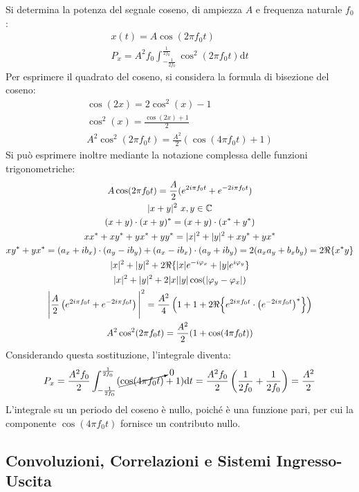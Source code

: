 \documentclass{article}
\newcommand{\df}{\mathrm{d}}
\begin{document}
Si determina la potenza del segnale coseno, di ampiezza $A$ e frequenza naturale $f_0$:
\begin{gather*}
    x(t)=A\cos\left(2\pi f_0t\right)\\
    P_x=\displaystyle A^2f_0\int_{-\frac{1}{2f_0}}^{\frac{1}{2f_0}}\cos^2(2\pi f_0 t)\df t
\end{gather*}
Per esprimere il quadrato del coseno, si considera la formula di bisezione del coseno:
\begin{gather*}
    \cos(2x)=2\cos^2(x)-1\\
    \cos^2(x)=\displaystyle\frac{\cos(2x)+1}{2}\\
    A^2\cos^2(2\pi f_0t)=\displaystyle\frac{A^2}{2}(\cos(4\pi f_0t)+1)
\end{gather*}
Si può esprimere inoltre mediante la notazione complessa delle funzioni trigonometriche:
\begin{gather*}
    A\cos(2\pi f_0t)=\displaystyle\frac{A}{2}(e^{2i\pi f_0t}+e^{-2i\pi f_0t})\\
    |x+y|^2\,\,x,y\in\mathbb{C}\\
    (x+y)\cdot(x+y)^*=(x+y)\cdot(x^*+y^*)\\
    xx^*+xy^*+yx^*+yy^*=|x|^2+|y|^2+xy^*+yx^*\\
    xy^*+yx^*=(a_x+ib_x)\cdot(a_y-ib_y)+(a_x-ib_x)\cdot(a_y+ib_y)=2(a_xa_y+b_xb_y)=2\Re\{x^*y\}\\
    |x|^2+|y|^2+2\Re\{|x|e^{-i\varphi_x}+|y|e^{i\varphi_y}\}\\
    |x|^2+|y|^2+2|x||y|\cos(|\varphi_y-\varphi_x|)\\
    \Bigg|\displaystyle\frac{A}{2}\left(e^{2i\pi f_0t}+e^{-2i\pi f_0t}\right)\Bigg|^2=\frac{A^2}{4}\left(1+1+2\Re\Bigl\{e^{2i\pi f_0t}\cdot\left(e^{-2i\pi f_0t}\right)^*\Bigr\}\right)\\
    A^2\cos^2(2\pi f_0t)=\displaystyle\frac{A^2}{2}(1+\cos(4\pi f_0t))
\end{gather*}
Considerando questa sostituzione, l'integrale diventa:
\begin{equation*}
    P_x=\displaystyle\frac{A^2f_0}{2}\int_{-\frac{1}{2f_0}}^{\frac{1}{2f_0}}(\cancelto{0}{\cos(4\pi f_0 t)}+1)\df t=\frac{A^2f_0}{2}\left(\frac{1}{2f_0}+\frac{1}{2f_0}\right)=\frac{A^2}{2}
\end{equation*}
L'integrale su un periodo del coseno è nullo, poiché è una funzione pari, per cui la componente $\cos(4\pi f_0 t)$ fornisce un contributo nullo. 

\subsection{Convoluzioni, Correlazioni e Sistemi Ingresso-Uscita}
\end{document}
